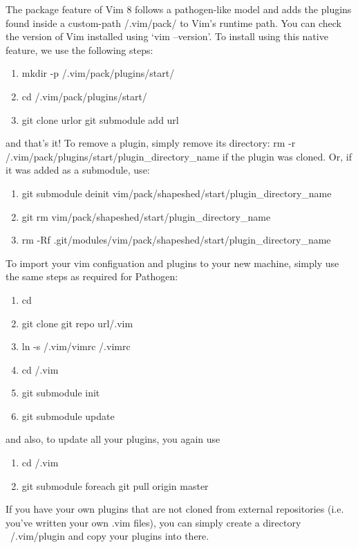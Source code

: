 The package feature of Vim 8 follows a pathogen-like model and adds the plugins
found inside a custom-path \tsim/.vim/pack/ to Vim's runtime path. You can check
the version of Vim installed using `vim --version'. To install using this native
feature, we use the following steps:
\begin{enumerate}
    \item mkdir -p \tsim/.vim/pack/plugins/start/
    \item cd \tsim/.vim/pack/plugins/start/
    \item git clone \tlangle url\trangle or git submodule add \tlangle url
        \trangle
\end{enumerate}
and that's it! To remove a plugin, simply remove its directory: rm -r
\tsim/.vim/pack/plugins/start/\tlangle plugin\_directory\_name \trangle if the
plugin was cloned. Or, if it was added as a submodule, use:
\begin{enumerate}
    \item git submodule deinit vim/pack/shapeshed/start/\tlangle plugin\_directory\_name \trangle
    \item git rm vim/pack/shapeshed/start/\tlangle plugin\_directory\_name \trangle
    \item rm -Rf .git/modules/vim/pack/shapeshed/start/\tlangle plugin\_directory\_name \trangle
\end{enumerate}
To import your vim configuation and plugins to your new machine, simply use the
same steps as required for Pathogen:
\begin{enumerate}
    \item cd \tsim
    \item git clone \tlangle git repo url\trangle \tsim/.vim
    \item ln -s \tsim/.vim/vimrc \tsim/.vimrc
    \item cd \tsim/.vim
    \item git submodule init
    \item git submodule update
\end{enumerate}
and also, to update all your plugins, you again use
\begin{enumerate}
    \item cd \tsim/.vim
    \item git submodule foreach git pull origin master
\end{enumerate}
If you have your own plugins that are not cloned from external repositories
(i.e. you've written your own .vim files), you can simply create a directory
~/.vim/plugin and copy your plugins into there.\\


